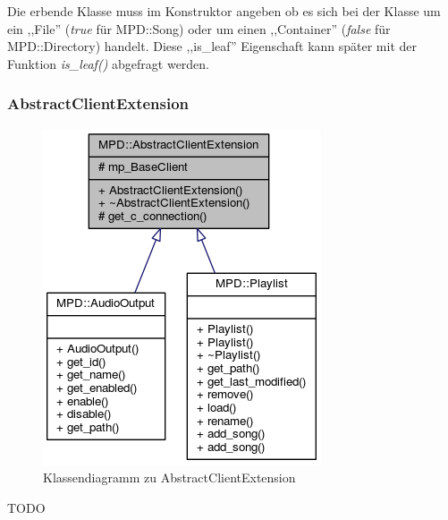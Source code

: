 Die erbende Klasse muss im Konstruktor angeben ob es sich bei der Klasse um ein ,,File'' (\emph{true} für MPD::Song) oder um einen ,,Container'' (\emph{false} für MPD::Directory) handelt.
Diese ,,is\_leaf'' Eigenschaft kann später mit der Funktion \emph{is\_leaf()} abgefragt werden.



\subsubsection{AbstractClientExtension}
\begin{figure}[htb!]
	\centering
        \includegraphics[scale=0.6]{AbstractClientExtension.png}
	\caption{Klassendiagramm zu AbstractClientExtension}
	\label{c_abstract_client_extension}
\end{figure}
TODO

